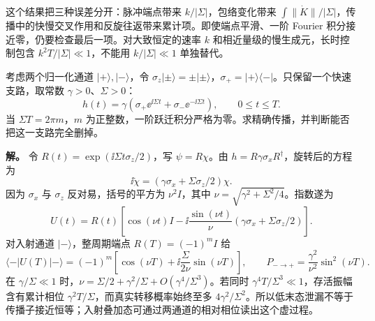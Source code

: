 这个结果把三种误差分开：脉冲端点带来 $k/|\Sigma|$，包络变化带来 $\int\|\dot K\|/|\Sigma|$，传播中的快慢交叉作用和反旋往返带来累计项。即使端点平滑、一阶 Fourier 积分接近零，仍要检查最后一项。对大致恒定的速率 $k$ 和相近量级的慢生成元，长时控制包含 $k^2T/|\Sigma|\ll1$，不能用 $k/|\Sigma|\ll1$ 单独替代。

\begin{exbox}
考虑两个归一化通道 $|+\rangle,|-\rangle$，令 $\sigma_z|\pm\rangle=\pm|\pm\rangle$，$\sigma_+=|+\rangle\langle-|$。只保留一个快速支路，取常数 $\gamma>0$、$\Sigma>0$：
\[
 h(t)=\gamma(\sigma_+\ee^{\ii\Sigma t}
                   +\sigma_-\ee^{-\ii\Sigma t}),\qquad 0\le t\le T.
\]
当 $\Sigma T=2\pi m$，$m$ 为正整数，一阶跃迁积分严格为零。求精确传播，并判断能否把这一支路完全删掉。

\textbf{解。} 令 $R(t)=\exp(\ii\Sigma t\sigma_z/2)$，写 $\psi=R\chi$。由 $h=R\gamma\sigma_xR^\dagger$，旋转后的方程为
\[
 \ii\dot\chi=(\gamma\sigma_x+\Sigma\sigma_z/2)\chi.
\]
因为 $\sigma_x$ 与 $\sigma_z$ 反对易，括号的平方为 $\nu^2 I$，其中 $\nu=\sqrt{\gamma^2+\Sigma^2/4}$。指数遂为
\[
 U(t)=R(t)\left[\cos(\nu t)I
 -\ii\frac{\sin(\nu t)}\nu
 (\gamma\sigma_x+\Sigma\sigma_z/2)\right].
\]
对入射通道 $|-\rangle$，整周期端点 $R(T)=(-1)^mI$ 给
\[
 \langle-|U(T)|-\rangle
 =(-1)^m\left[\cos(\nu T)
       +\ii\frac{\Sigma}{2\nu}\sin(\nu T)\right],\qquad
 P_{-\to+}=\frac{\gamma^2}{\nu^2}\sin^2(\nu T).
\]
在 $\gamma/\Sigma\ll1$ 时，$\nu=\Sigma/2+\gamma^2/\Sigma+O(\gamma^4/\Sigma^3)$。若同时 $\gamma^4T/\Sigma^3\ll1$，存活振幅含有累计相位 $\gamma^2T/\Sigma$，而真实转移概率始终至多 $4\gamma^2/\Sigma^2$。所以低末态泄漏不等于传播子接近恒等；入射叠加态可通过两通道的相对相位读出这个虚过程。
\end{exbox}

